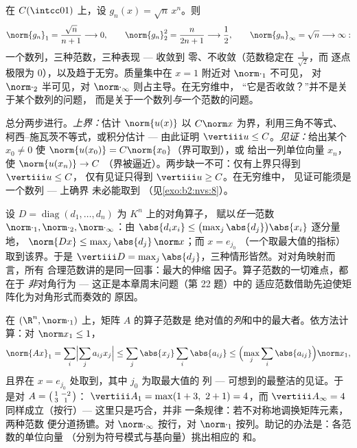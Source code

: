 \begin{example}\label{ex:b2:nvs:sqrtnxn}
在 $C(\intcc01)$ 上，设 $g_n(x) = \sqrt{n}\,x^n$。则
\[
\norm{g_n}_1 = \frac{\sqrt n}{n + 1} \longrightarrow 0,
\qquad
\norm{g_n}_2^2 = \frac{n}{2n + 1} \longrightarrow \frac12,
\qquad
\norm{g_n}_\infty = \sqrt n \longrightarrow \infty :
\]
一个数列，三种范数，三种表现 --- 收敛到
零、不收敛（范数稳定在 $\frac1{\sqrt2}$，而
逐点极限为 $0$），以及趋于无穷。质量集中在
$x = 1$ 附近对 $\norm\cdot_1$ 不可见，
对 $\norm\cdot_2$ 半可见，对 $\norm\cdot_\infty$ 则占主导。在无穷维中，
“它是否收敛？”并不是关于某个数列的问题，
而是关于一个数列\emph{与}一个范数的问题。
\end{example}

\begin{method}[计算算子范数]\label{met:b2:nvs:opnorm}
总分两步进行。\emph{上界：}估计
$\norm{u(x)}$ 以 $C\norm x$ 为界，利用三角不等式、
柯西–施瓦茨不等式，或积分估计 --- 由此证明 $\vertiii u
\leq C$。\emph{见证：}给出某个 $x_0 \neq 0$
使 $\norm{u(x_0)} = C\norm{x_0}$（界可取到），或
给出一列单位向量 $x_n$，使 $\norm{u(x_n)} \to C$
（界被逼近）。两步缺一不可：仅有上界只得到 $\vertiii u \leq C$，
仅有见证只得到 $\vertiii u \geq C$。在无穷维中，
见证可能须是一个数列 --- 上确界
未必能取到
（见\cref{exo:b2:nvs:8}）。
\end{method}

\begin{example}[对角算子对各范数一视同仁]\label{ex:b2:nvs:diagonalnorm}
设 $D = \operatorname{diag}(d_1, \dots, d_n)$ 为 $K^n$ 上的对角算子，
赋以\emph{任一}范数 $\norm\cdot_1, \norm\cdot_2,
\norm\cdot_\infty$：由 $\abs{d_ix_i} \leq
\bigl(\max_j\abs{d_j}\bigr)\abs{x_i}$ 逐分量地，
$\norm{Dx} \leq \max_j\abs{d_j}\,\norm x$；而 $x = e_{j_0}$
（一个取最大值的指标）取到该界。于是 $\vertiii D =
\max_j\abs{d_j}$，三种情形皆然。对对角映射而言，所有
合理范数讲的是同一回事：最大的伸缩
因子。算子范数的一切难点，都在于
\emph{非}对角行为 --- 这正是本章周末问题（第 22 题）中的
适应范数借助先迫使矩阵化为对角形式而奏效的
原因。
\end{example}

\begin{example}\label{ex:b2:nvs:columnsums}
在 $(\R^n, \norm\cdot_1)$ 上，矩阵 $A$ 的算子范数是
绝对值的\emph{列}和中的最大者。依方法计算：对
$\norm x_1 \leq 1$，
\[
\norm{Ax}_1 = \sum_i\Bigl|\sum_j a_{ij}x_j\Bigr|
\leq \sum_j \abs{x_j}\sum_i\abs{a_{ij}}
\leq \Bigl(\max_j\sum_i\abs{a_{ij}}\Bigr)\norm x_1 ,
\]
且界在 $x = e_{j_0}$ 处取到，其中 $j_0$ 为取最大值的
列 --- 可想到的最整洁的见证。于是对 $A =
\begin{psmallmatrix}1 & -2\\ 3 & 1\end{psmallmatrix}$：
$\vertiii A_1 = \max(1 + 3,\ 2 + 1) = 4$，而
$\vertiii A_\infty = 4$ 同样成立（按行）--- 这里只是巧合，并非
一条规律：若不对称地调换矩阵元素，两种范数
便分道扬镳。对 $\norm\cdot_\infty$ 按行，对
$\norm\cdot_1$ 按列。助记的办法是：各范数的单位向量
（分别为符号模式与基向量）挑出相应的
和。
\end{example}


